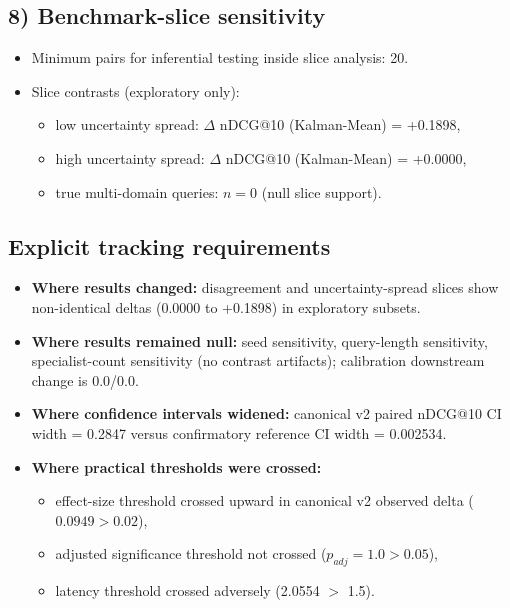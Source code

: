 \subsection*{8) Benchmark-slice sensitivity}
\begin{itemize}
  \item Minimum pairs for inferential testing inside slice analysis: 20.
  \item Slice contrasts (exploratory only):
    \begin{itemize}
      \item low uncertainty spread: $\Delta$ nDCG@10 (Kalman-Mean) = +0.1898,
      \item high uncertainty spread: $\Delta$ nDCG@10 (Kalman-Mean) = +0.0000,
      \item true multi-domain queries: $n=0$ (null slice support).
    \end{itemize}
\end{itemize}

\subsection*{Explicit tracking requirements}
\begin{itemize}
  \item \textbf{Where results changed:} disagreement and uncertainty-spread slices show non-identical deltas (0.0000 to +0.1898) in exploratory subsets.
  \item \textbf{Where results remained null:} seed sensitivity, query-length sensitivity, specialist-count sensitivity (no contrast artifacts); calibration downstream change is 0.0/0.0.
  \item \textbf{Where confidence intervals widened:} canonical v2 paired nDCG@10 CI width = 0.2847 versus confirmatory reference CI width = 0.002534.
  \item \textbf{Where practical thresholds were crossed:}
    \begin{itemize}
      \item effect-size threshold crossed upward in canonical v2 observed delta ($0.0949 > 0.02$),
      \item adjusted significance threshold not crossed ($p_{adj}=1.0 > 0.05$),
      \item latency threshold crossed adversely (2.0554 $>$ 1.5).
    \end{itemize}
\end{itemize}
